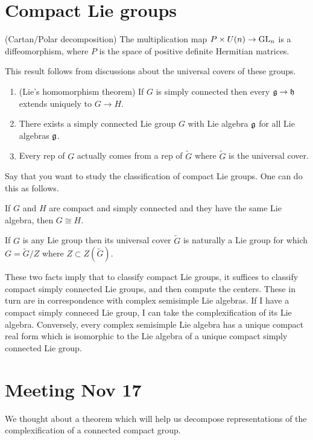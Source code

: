 \documentclass[12pt]{article}
\begin{document}
\section{Compact Lie groups}
\begin{theorem}
    (Cartan/Polar decomposition) The multiplication map $P\times U(n)\to \operatorname{GL}_n$ is a diffeomorphism, where $P$
    is the space of positive definite Hermitian matrices.
\end{theorem} This result follows from discussions about the universal covers of these groups. 
\begin{theorem}
    \begin{enumerate}
        \item (Lie's homomorphism theorem) If $G$ is simply connected then every $\mathfrak{g}\to \mathfrak{h}$ extends uniquely to $G\to H$.
        \item There exists a simply connected Lie group $G$ with Lie algebra $\mathfrak{g}$ for all Lie algebras $\mathfrak{g}$. 
        \item Every rep of $G$ actually comes from a rep of $\tilde G$ where $\tilde G$ is the universal cover.
    \end{enumerate}
\end{theorem}
Say that you want to study the classification of compact Lie groups. One can do this as follows.
\begin{fact}
    If $G$ and $H$ are compact and simply connected and they have the same Lie algebra, then $G\cong H$.
\end{fact}
\begin{fact}
    If $G$ is any Lie group then its universal cover $\tilde G$ is naturally a Lie group for which 
    $G = \tilde G/Z$ where $Z\subset Z(\tilde G)$.
\end{fact}
These two facts imply that to classify compact Lie groups, it suffices to classify
compact simply connected Lie groups, and then compute the centers. These in turn are in 
correspondence with complex semisimple Lie algebras. If I have a compact simply conneced Lie group, I can take
the complexification of its Lie algebra. Conversely, every complex semisimple Lie algebra has a unique compact real form which
is isomorphic to the Lie algebra of a unique compact simply connected Lie group.

\section{Meeting Nov 17}
We thought about a theorem which will help us decompose representations of the complexification of a connected compact group.
\end{document}
